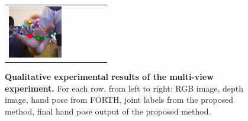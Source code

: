 \begin{figure}
\begin{tabular}{@{}cc@{}c@{}c@{}c@{}c@{}}
		\includegraphics[width=2.35cm]{fig/hand/qual/vote/image_0440.png} 
		\label{fig/hand/multi7} \\
	\end{tabular}
	\caption{\textbf{Qualitative experimental results of the multi-view experiment.} For each row, from left to right: RGB image, depth image, hand pose from FORTH, joint labels from the proposed method, final hand pose output of the proposed method.}
	\label{fig/hand/multiqual}
\end{figure} 
